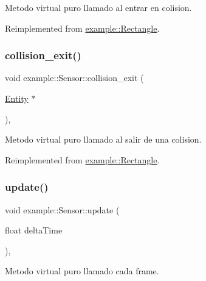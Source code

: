 Metodo virtual puro llamado al entrar en colision. 



Reimplemented from \mbox{\hyperlink{classexample_1_1_rectangle_a60fa2e1468370d1c7021f25df8a4c1d7}{example\+::\+Rectangle}}.

\mbox{\label{classexample_1_1_sensor_a0bc1b5c11b00ac855c35863ffc9c70d9}} 
\subsubsection{\texorpdfstring{collision\_exit()}{collision\_exit()}}
{\footnotesize\ttfamily void example\+::\+Sensor\+::collision\+\_\+exit (\begin{DoxyParamCaption}\item[{\mbox{\hyperlink{classexample_1_1_entity}{Entity}} $\ast$}]{ }\end{DoxyParamCaption})\hspace{0.3cm}{\ttfamily [override]}, {\ttfamily [virtual]}}



Metodo virtual puro llamado al salir de una colision. 



Reimplemented from \mbox{\hyperlink{classexample_1_1_rectangle_a547c35d87f139ffc190f542830606754}{example\+::\+Rectangle}}.

\mbox{\label{classexample_1_1_sensor_a6db61100875509315537c46418fbc250}} 
\subsubsection{\texorpdfstring{update()}{update()}}
{\footnotesize\ttfamily void example\+::\+Sensor\+::update (\begin{DoxyParamCaption}\item[{float}]{delta\+Time }\end{DoxyParamCaption})\hspace{0.3cm}{\ttfamily [override]}, {\ttfamily [virtual]}}



Metodo virtual puro llamado cada frame. 


